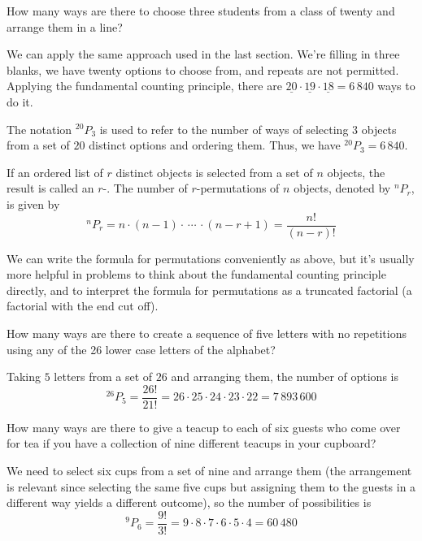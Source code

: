 \begin{example}
How many ways are there to choose three students from a class of twenty and arrange them in a line?

We can apply the same approach used in the last section. We're filling in three blanks, we have twenty options to choose from, and repeats are not permitted. Applying the fundamental counting principle, there are $\underline{20} \cdot \underline{19} \cdot \underline{18} = 6\,840$ ways to do it. 

\noindent The notation $^{20}P_3$ is used to refer to the number of ways of selecting $3$ objects from a set of $20$ distinct options and ordering them. Thus, we have $^{20}P_3 = 6\,840$.
\end{example}

\begin{definition}\label{permutationdefinition}
If an ordered list of $r$ distinct objects is selected from a set of $n$ objects, the result is called an $r$-. The number of $r$-permutations of $n$ objects, denoted by $^{n}P_r$, is given by
$$^nP_r = n \cdot (n-1) \cdot \, \cdots \, \cdot (n-r+1) = \frac{n!}{(n-r)!}$$
\end{definition}

\begin{remark}
We can write the formula for permutations conveniently as above, but it's usually more helpful in problems to think about the fundamental counting principle directly, and to interpret the formula for permutations as a truncated factorial (a factorial with the end cut off).
\end{remark}

\begin{example}
How many ways are there to create a sequence of five letters with no repetitions using any of the 26 lower case letters of the alphabet?

Taking $5$ letters from a set of $26$ and arranging them, the number of options is
$$^{26}P_5 = \frac{26!}{21!} = 26 \cdot 25 \cdot 24 \cdot 23 \cdot 22 = 7\,893\,600$$
\end{example}

\begin{example}
How many ways are there to give a teacup to each of six guests who come over for tea if you have a collection of nine different teacups in your cupboard?

We need to select six cups from a set of nine and arrange them (the arrangement is relevant since selecting the same five cups but assigning them to the guests in a different way yields a different outcome), so the number of possibilities is $$^{9}P_6 = \frac{9!}{3!} = 9 \cdot 8 \cdot 7 \cdot 6 \cdot 5 \cdot 4 = 60\,480$$
\end{example}

